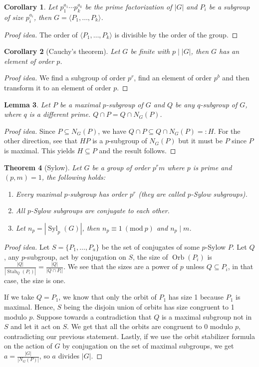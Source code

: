 \documentclass[paper=a4, fontsize=12pt]{scrartcl} %
\newtheorem{thm}{Theorem}[section]
\newtheorem{cor}[thm]{Corollary}
\newtheorem{lem}[thm]{Lemma}
\theoremstyle{definition}
\theoremstyle{remark}
\newcommand{\Mod}[1]{\ (\text{mod}\ #1)}
\DeclareMathOperator{\orb}{Orb}
\DeclareMathOperator{\stab}{Stab}
\DeclareMathOperator{\syl}{Syl}
\numberwithin{equation}{section} %
\numberwithin{figure}{section} %
\numberwithin{table}{section} %
\begin{document}
\begin{cor}
	Let $p_1^{a_1}\cdots p_k^{a_k}$ be the prime factorization of $|G|$ and $P_i$ be a subgroup of size $p_i^{a_i}$, then $G = \langle P_1, \dots, P_k \rangle$.
\end{cor}
\begin{proof}[Proof idea]
	The order of $\langle P_1, \dots, P_k \rangle$ is divisible by the order of the group.
\end{proof}
\begin{cor}[Cauchy's theorem]
	Let $G$ be finite with $p \mid |G|$, then $G$ has an element of order $p$.
\end{cor}
\begin{proof}[Proof idea]
	We find a subgroup of order $p^r$, find an element of order $p^b$ and then transform it to an element of order $p$.
\end{proof}
\begin{lem}
	Let $P$ be a maximal $p$-subgroup of $G$ and $Q$ be any $q$-subgroup of $G$, where $q$ is a different prime. $Q \cap P = Q \cap N_G(P)$.
\end{lem}
\begin{proof}[Proof idea]
	Since $P \subseteq N_G(P)$, we have $Q \cap P \subseteq Q \cap N_G(P) =: H$. For the other direction, see that $HP$ is a $p$-subgroup of $N_G(P)$ but it must be $P$ since $P$ is maximal. This yields $H \subseteq P$ and the result follows.
\end{proof}
\begin{thm}[Sylow]
	Let $G$ be a group of order $p^rm$ where $p$ is prime and $(p,m) = 1$, the following holds:
	\begin{enumerate}
		\item Every maximal $p$-subgroup has order $p^r$ (they are called $p$-Sylow subgroups).
		\item All $p$-Sylow subgroups are conjugate to each other.
		\item Let $n_p = |\syl_p(G)|$, then $n_p \equiv 1 \Mod{p}$ and $n_p \mid m$.
	\end{enumerate}
\end{thm}
\begin{proof}[Proof idea]
	Let $S = \{P_1, \dots, P_a\}$ be the set of conjugates of some $p$-Sylow $P$. Let $Q$, any $p$-subgroup, act by conjugation on $S$, the size of $\orb(P_i)$ is $\frac{|Q|}{|\stab_Q(P_i)|} = \frac{|Q|}{|Q \cap P_i|}$. We see that the sizes are a power of $p$ unless $Q \subseteq P_i$, in that case, the size is one.
	
	If we take $Q = P_1$, we know that only the orbit of $P_1$ has size 1 because $P_1$ is maximal. Hence, $S$ being the disjoin union of orbits has size congruent to 1 modulo $p$. Suppose towards a contradiction that $Q$ is a maximal subgroup not in $S$ and let it act on $S$. We get that all the orbits are congruent to 0 modulo $p$, contradicting our previous statement. Lastly, if we use the orbit stabilizer formula on the action of $G$ by conjugation on the set of maximal subgroups, we get $a = \frac{|G|}{|N_G(P)|}$, so $a$ divides $|G|$. 
\end{proof}
\end{document}
